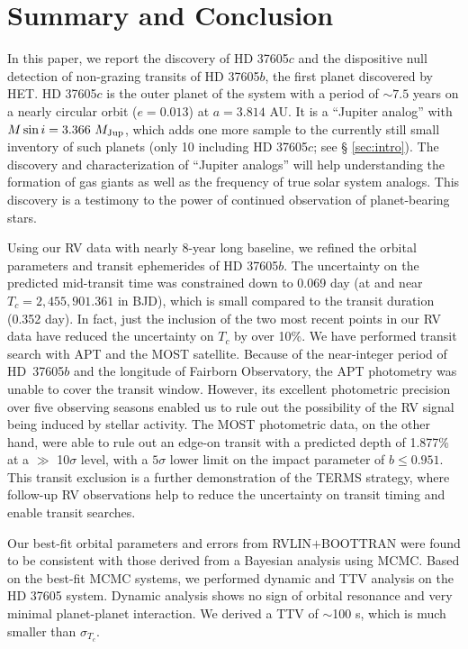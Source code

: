 \section{Summary and Conclusion}\label{sec:summary}

In this paper, we report the discovery of HD 37605$c$ and the
dispositive null detection of non-grazing transits of HD 37605$b$, the first
planet discovered by HET. HD 37605$c$ is the outer planet of the
system with a period of $\sim 7.5$ years on a nearly circular orbit
($e=0.013$) at $a=3.814$ AU. It is a ``Jupiter analog'' with $M\sin{i} =
3.366\ M_{\rm Jup}$, which adds one more sample to the currently still small
inventory of such planets (only 10 including HD 37605$c$; see \S
\ref{sec:intro}). The discovery and characterization of ``Jupiter
analogs'' will help understanding the formation of gas giants as well
as the frequency of true solar system analogs. This discovery is a
testimony to the power of continued observation of planet-bearing
stars.

Using our RV data with nearly 8-year long baseline, we refined the
orbital parameters and transit ephemerides of HD 37605$b$. The
uncertainty on the predicted mid-transit time was constrained down to
0.069 day (at and near $T_c = 2,455,901.361$ in BJD), which is small
compared to the transit duration (0.352 day). In fact, just the
inclusion of the two most recent points in our RV data have reduced
the uncertainty on $T_c$ by over 10\%. We have performed transit
search with APT and the MOST satellite. Because of the near-integer
period of HD~37605$b$ and the longitude of Fairborn Observatory, the
APT photometry was unable to cover the transit window. However, its
excellent photometric precision over five observing seasons enabled us
to rule out the possibility of the RV signal being induced by stellar
activity. The MOST photometric data, on the other hand, were able to
rule out an edge-on transit with a predicted depth of 1.877\% at a
$\gg$ 10$\sigma$ level, with a $5\sigma$ lower limit on the impact
parameter of $b \leq 0.951$. This transit exclusion is a further
demonstration of the TERMS strategy, where follow-up RV observations
help to reduce the uncertainty on transit timing and enable transit
searches.

Our best-fit orbital parameters and errors from RVLIN$+$BOOTTRAN were
found to be consistent with those derived from a Bayesian analysis
using MCMC. Based on the best-fit MCMC systems, we performed dynamic
and TTV analysis on the HD 37605 system. Dynamic analysis shows no
sign of orbital resonance and very minimal planet-planet
interaction. We derived a TTV of $\sim$100 s, which is much smaller
than $\sigma_{T_c}$.


